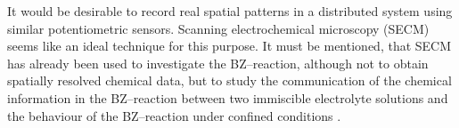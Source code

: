 \documentclass[3p]{elsarticle}
\begin{document}

It would be desirable to record real spatial patterns in a distributed system using similar potentiometric sensors.
Scanning electrochemical microscopy (SECM) seems like an ideal technique for this purpose. 
It must be mentioned, that SECM has already been used to investigate the BZ--reaction, although not to obtain spatially resolved chemical data, but to study the communication of the chemical information in the BZ--reaction between two immiscible electrolyte solutions \cite{tomasi2014chemical} and the behaviour of the BZ--reaction under confined conditions \cite{stockmann2015scanning}. 
\end{document}
